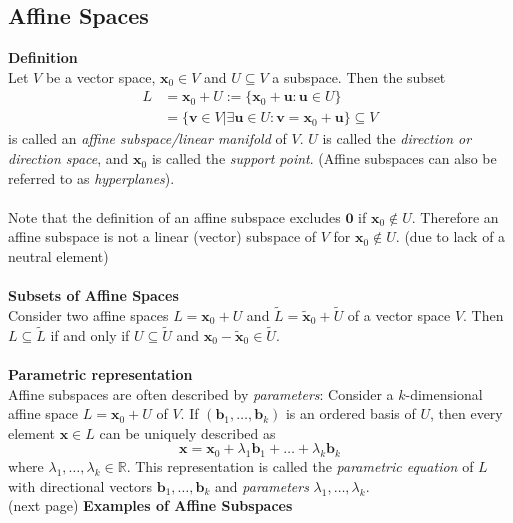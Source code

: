 \documentclass{report}
\begin{document}
\subsection{Affine Spaces} %
\textbf{Definition}\\
Let $V$ be a vector space, $\bm{x}_0\in V$ and $U\subseteq V$ a subspace. Then the subset
\begin{align*}
L&=\bm{x}_0+U:=\{\bm{x}_0+\bm{u}:\bm{u}\in U\}\\
&=\{\bm{v}\in V|\exists\bm{u}\in U:\bm{v}=\bm{x}_0+\bm{u}\}\subseteq V
\end{align*}
is called an \textit{affine subspace/linear manifold} of $V$. $U$ is called the \textit{direction or direction space},
and $\bm{x}_0$ is called the \textit{support point}. (Affine subspaces can also be referred to as 
\textit{hyperplanes}).\\
\vspace{1mm}\\
Note that the definition of an affine subspace excludes $\mathbf{0}$ if $\bm{x}_0\notin U$. 
Therefore an affine subspace is not a linear (vector) subspace of $V$ for $\bm{x}_0\notin U$. 
(due to lack of a neutral element)\\
\vspace{1mm}\\
\textbf{Subsets of Affine Spaces}\\
Consider two affine spaces $L=\bm{x}_0+U$
and $\tilde{L}=\tilde{\bm{x}}_0+\tilde{U}$ of a vector space $V$. 
Then $L\subseteq\tilde{L}$ if and only if $U\subseteq\tilde{U}$ and $\bm{x}_0-\tilde{\bm{x}}_0\in\tilde{U}$.\\
\vspace{1mm}\\
\textbf{Parametric representation}\\
Affine subspaces are often described by \textit{parameters}: Consider a $k$-dimensional
affine space $L=\bm{x}_0+U$ of $V$. If $(\bm{b}_1,\ldots,\bm{b}_k)$ is an ordered basis of $U$,
then every element $\bm{x}\in L$ can be uniquely described as
\begin{equation*}
\bm{x}=\bm{x}_0+\lambda_1\bm{b}_1+\ldots+
\lambda_k\bm{b}_k
\end{equation*}
where $\lambda_1,\ldots,\lambda_k\in\mathbb{R}$. This representation is called the \textit{parametric equation} 
of $L$ with directional vectors $\bm{b}_1,\ldots,\bm{b}_k$ and \textit{parameters} $\lambda_1,\ldots,\lambda_k$.
\\
(next page)
\newpage
\noindent\textbf{Examples of Affine Subspaces}
\end{document}
